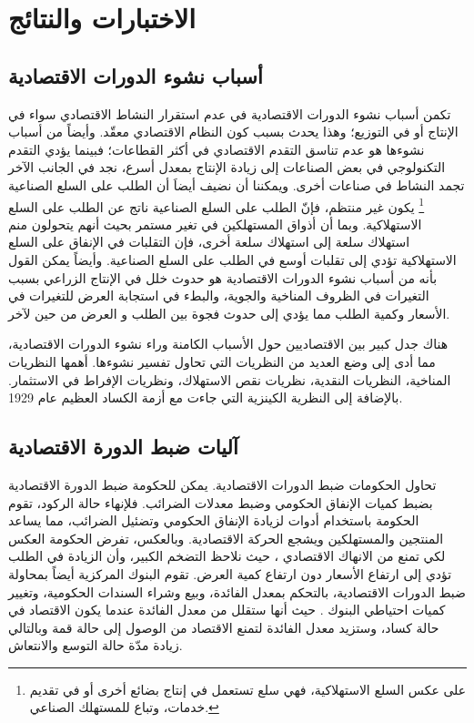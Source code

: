 


\chapter{الاختبارات والنتائج}

\section{أسباب نشوء الدورات الاقتصادية}
\label{sec:cause}
تكمن أسباب نشوء الدورات الاقتصادية في عدم استقرار النشاط الاقتصادي 
سواء في الإنتاج أو في التوزيع؛ وهذا يحدث بسبب كون النظام الاقتصادي معقّد.
وأيضاً من أسباب نشوءها هو عدم تناسق التقدم الاقتصادي
في أكثر القطاعات؛
فبينما يؤدي التقدم التكنولوجي في بعض الصناعات إلى زيادة الإنتاج 
بمعدل أسرع، نجد في الجانب الآخر تجمد النشاط في صناعات أخرى.
ويمكننا أن نضيف أيضاَ أن الطلب على السلع الصناعية%
\footnote{%
	على عكس السلع الاستهلاكية، فهي سلع تستعمل في إنتاج بضائع أخرى أو في تقديم خدمات، وتباع للمستهلك الصناعي.
}
يكون غير منتظم،
فإنّ الطلب على السلع الصناعية ناتج عن الطلب 
على السلع الاستهلاكية. وبما أن أذواق المستهلكين في تغير مستمر
بحيث أنهم يتحولون منم استهلاك سلعة إلى استهلاك سلعة أخرى،
فإن التقلبات في الإنفاق على السلع الاستهلاكية تؤدي إلى تقلبات
أوسع في الطلب على السلع الصناعية.
وأيضاً يمكن القول بأنه من أسباب نشوء الدورات الاقتصادية هو حدوث خلل في
الإنتاج الزراعي بسبب التغيرات في الظروف المناخية والجوية،
والبطء في استجابة العرض للتغيرات في الأسعار وكمية الطلب
مما يؤدي إلى حدوث فجوة بين الطلب و العرض من حين لآخر.

هناك جدل كبير بين الاقتصاديين حول الأسباب الكامنة وراء نشوء الدورات الاقتصادية، مما أدى إلى وضع العديد من النظريات التي تحاول تفسير نشوءها.
أهمها النظريات المناخية، النظريات النقدية، نظريات نقص الاستهلاك، ونظريات الإفراط في الاستثمار. بالإضافة إلى النظرية الكينزية التي جاءت مع
أزمة الكساد العظيم  عام 1929.


\section{آليات ضبط الدورة الاقتصادية}
\label{sec:manage}
تحاول الحكومات ضبط الدورات الاقتصادية. يمكن للحكومة ضبط الدورة
الاقتصادية بضبط كميات الإنفاق الحكومي وضبط معدلات الضرائب.
فلإنهاء حالة الركود، تقوم الحكومة باستخدام أدوات لزيادة الإنفاق الحكومي
وتضئيل الضرائب، مما يساعد المنتجين والمستهلكين ويشجع الحركة الاقتصادية.
وبالعكس، تفرض الحكومة العكس لكي تمنع من
الانهاك الاقتصادي ، حيث نلاحظ
التضخم الكبير، وأن الزيادة في الطلب تؤدي إلى ارتفاع الأسعار دون ارتفاع
كمية العرض.
تقوم البنوك المركزية أيضاً بمحاولة ضبط الدورات الاقتصادية،
بالتحكم	بمعدل الفائدة، وبيع وشراء السندات الحكومية، 
وتغيير كميات احتياطي البنوك .
حيث أنها ستقلل من معدل الفائدة عندما يكون الاقتصاد في حالة كساد،
وستزيد معدل الفائدة لتمنع الاقتصاد من الوصول إلى حالة قمة وبالتالي
زيادة مدّة حالة التوسع والانتعاش.


